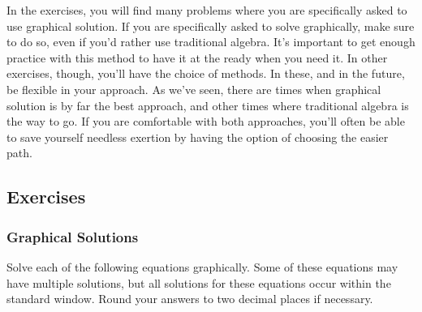 In the exercises, you will find many problems where you are specifically asked to use graphical solution. If you are specifically asked to solve graphically, make sure to do so, even if you’d rather use traditional algebra. It’s important to get enough practice with this method to have it at the ready when you need it. In other exercises, though, you’ll have the choice of methods. In these, and in the future, be flexible in your approach. As we’ve seen, there are times when graphical
solution is by far the best approach, and other times where traditional algebra is the way to go. If you are comfortable with both approaches, you’ll often be able to save yourself needless exertion by having the option of choosing the easier path.

%
%

\clearpage

\subsection{Exercises}

\subsubsection*{Graphical Solutions}
Solve each of the following equations graphically. Some of these equations may have multiple solutions, but all solutions for these equations occur within the standard window. Round your answers to two decimal places if necessary.
\bigskip
{} 

\bigskip
{}

\bigskip
{} 

\bigskip
{}

\bigskip
{} 

\bigskip
{}

\bigskip
{} 

\bigskip
{}

\bigskip
{} 

\bigskip
{}

